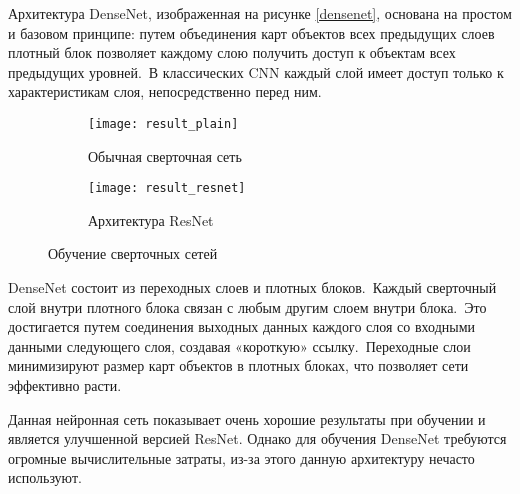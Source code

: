 Архитектура DenseNet, изображенная на рисунке \ref{densenet}, основана на простом и базовом принципе: путем объединения карт объектов всех предыдущих слоев плотный блок позволяет каждому слою получить доступ к объектам всех предыдущих уровней. В классических CNN каждый слой имеет доступ только к характеристикам слоя, непосредственно перед ним.

\vspace{1em}
\begin{figure}
	\centering
	\begin{subfigure}{0.45\linewidth}
		\texttt{[image: result\_plain]}
		\caption{Обычная сверточная сеть}
	\end{subfigure}
    \hfill
	\begin{subfigure}{0.45\linewidth}
		\texttt{[image: result\_resnet]}
		\caption{Архитектура ResNet}
	\end{subfigure}
	\caption{Обучение сверточных сетей}
	\label{analis_plain_resnet}
\end{figure}

DenseNet состоит из переходных слоев и плотных блоков. Каждый сверточный слой внутри плотного блока связан с любым другим слоем внутри блока. Это достигается путем соединения выходных данных каждого слоя со входными данными следующего слоя, создавая «короткую» ссылку. Переходные слои минимизируют размер карт объектов в плотных блоках, что позволяет сети эффективно расти.

Данная нейронная сеть показывает очень хорошие результаты при обучении и является улучшенной версией ResNet. Однако для обучения DenseNet требуются огромные вычислительные затраты, из-за этого данную архитектуру нечасто используют.

